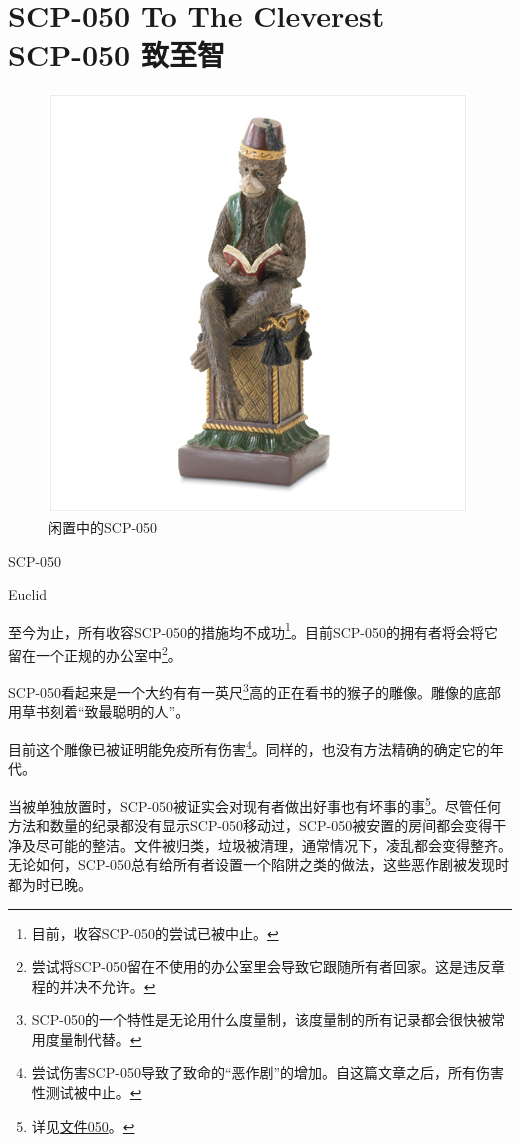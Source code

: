 \chapter[SCP-050 致至智]{
    SCP-050 To The Cleverest\\
    SCP-050 致至智
}

\label{chap:SCP-050}

\begin{figure}[H]
    \centering
    \includegraphics[width=0.5\linewidth]{images/SCP-050.jpg}
    \caption*{闲置中的SCP-050}
\end{figure}

SCP-050

Euclid

至今为止，所有收容SCP-050的措施均不成功\footnote{目前，收容SCP-050的尝试已被中止。}。目前SCP-050的拥有者将会将它留在一个正规的办公室中\footnote{尝试将SCP-050留在不使用的办公室里会导致它跟随所有者回家。这是违反章程的并决不允许。}。

SCP-050看起来是一个大约有有一英尺\footnote{SCP-050的一个特性是无论用什么度量制，该度量制的所有记录都会很快被常用度量制代替。}高的正在看书的猴子的雕像。雕像的底部用草书刻着“致最聪明的人”。

目前这个雕像已被证明能免疫所有伤害\footnote{尝试伤害SCP-050导致了致命的“恶作剧”的增加。自这篇文章之后，所有伤害性测试被中止。}。同样的，也没有方法精确的确定它的年代。

当被单独放置时，SCP-050被证实会对现有者做出好事也有坏事的事\footnote{详见\hyperref[sec:DOC-document-050]{文件050}。}。尽管任何方法和数量的纪录都没有显示SCP-050移动过，SCP-050被安置的房间都会变得干净及尽可能的整洁。文件被归类，垃圾被清理，通常情况下，凌乱都会变得整齐。无论如何，SCP-050总有给所有者设置一个陷阱之类的做法，这些恶作剧被发现时都为时已晚。

\hr

\newpage

